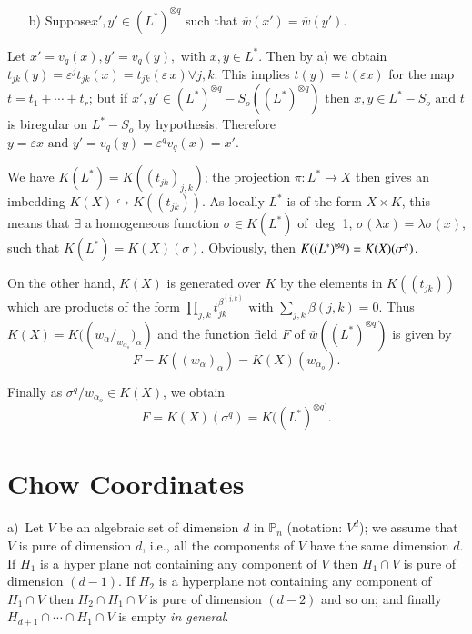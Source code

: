 {\begin{enumerate}
\item[b)]Suppose\pageoriginale $x',y' \in (L^*)^{\otimes q}$ such that
  $\overline{w}(x')=\overline{w}(y')$. 
\end{enumerate}

Let $x'=v_q(x), y'=v_q(y), \text{ with }x,y \in L^*$. Then by a) we
obtain  $t_{jk}(y)=\varepsilon^j t_{jk}(x)=t_{jk}(\varepsilon \,x)
\forall j, k$. This implies $t(y)=t(\varepsilon x)$ for the
map $t=t_1 +\cdots +t_r$; but if $x',y'\in (L^*)^{\otimes
  q}-S_o((L^*)^{\otimes q})\text{ then } x,y \in L^* -S_o\text{ and }
t$ is biregular on $L^*-S_o$ by hypothesis. Therefore $y=\varepsilon x
\text{ and } y'=v_q(y)=\varepsilon^q v_q(x)=x'$. 

\medskip
{} 

We have $K(L^*)= K((t_{jk})_{j,k})$; the projection $\pi:L^* \to X$
then gives an imbedding $K(X) \hookrightarrow K((t_{jk}))$. As locally
$L^*$ is of the form $X \times K$, this means that $\exists$ a
homogeneous function $\sigma \in K(L^*)$ of $\deg$  1,
$\sigma(\lambda x)=\lambda \sigma (x)$, such that
$K(L^*)=K(X)(\sigma)$. Obviously, then $K((L^*)^{\otimes q}) =\break K(X)
(\sigma^q)$. 

On the other hand, $K(X)$ is generated over $K$ by the elements in
$K((t_{jk}))$ which are products of the form $\prod\limits_{j,k}
t_{jk}^{\beta^{(j,k)}}\text{ with } \sum \limits_{j,k}
\beta(j,k)=0$. Thus $K(X)=K((w_{\alpha}/_{w_{\alpha_o}}\big)_{\alpha}
)$ and the function field $F$ of $\overline{w}((L^*)^{\otimes
  q})$ is given by  
$$
F=K((w_{\alpha})_{\alpha})= K(X)(w_{\alpha_o}).
$$

Finally as  $\sigma^q /w_{\alpha_o} \in K(X)$, we obtain 
\begin{equation*}
  F=K(X)(\sigma^q)=K((L^*)^{\otimes q)}.\tag*{Q.E.D}
\end{equation*}

\section{Chow Coordinates}\label{chap1:sec3}%

a)~\pageoriginale Let $V$ be an algebraic set of dimension $d$ in $\mathbb{P}_n$
(notation: $V^d$); we assume that $V$ is pure of dimension $d$, i.e., all the
components of $V$ have the same dimension $d$. If $H_1$ is a hyper
plane not containing any component of $V$ then $H_1 \cap V$ is pure of
dimension $(d-1)$. If $H_2$ is a hyperplane not containing any
component of $H_1 \cap V \text{ then } H_2 \cap H_1 \cap V$ is pure of
dimension $(d-2)$ and so on; and finally $H_{d+1}\cap \cdots \cap H_1 \cap V$
is empty \textit{ in general}. 

}
